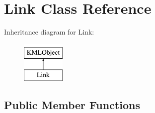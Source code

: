 \hypertarget{classLink}{
\section{Link Class Reference}
\label{d5/d19/classLink}
}
Inheritance diagram for Link:\begin{figure}[H]
\begin{center}
\leavevmode
\includegraphics[height=2.000000cm]{d5/d19/classLink}
\end{center}
\end{figure}
\subsection*{Public Member Functions}
